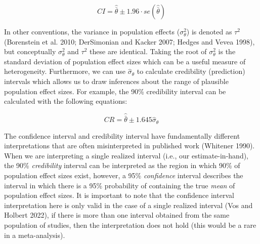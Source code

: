 \documentclass[
  letterpaper,
  DIV=11,
  numbers=noendperiod]{scrreprt}
\begin{document}
\[
CI = \hat{\bar{\theta}} \pm 1.96\cdot se(\hat{\bar{\theta}})
\]

In other conventions, the variance in population effects
(\(\sigma^2_\theta\)) is denoted as \(\tau^2\) (Borenstein et al. 2010;
DerSimonian and Kacker 2007; Hedges and Vevea 1998), but conceptually
\(\sigma^2_\theta\) and \(\tau^2\) these are identical. Taking the root
of \(\sigma^2_\theta\) is the standard deviation of population effect
sizes which can be a useful measure of heterogeneity. Furthermore, we
can use \(\hat{\sigma}_\theta\) to calculate credibility (prediction)
intervals which allows us to draw inferences about the range of
plausible population effect sizes. For example, the 90\% credibility
interval can be calculated with the following equations:

\[
CR = \hat{\bar{\theta}} \pm 1.645\hat{\sigma}_\theta
\]

The confidence interval and credibility interval have fundamentally
different interpretations that are often misinterpreted in published
work (Whitener 1990). When we are interpreting a single realized
interval (i.e., our estimate-in-hand), the 90\% \emph{credibility}
interval can be interpreted as the region in which 90\% of population
effect sizes exist, however, a 95\% \emph{confidence} interval describes
the interval in which there is a 95\% probability of containing the true
\emph{mean} of population effect sizes. It is important to note that the
confidence interval interpretation here is only valid in the case of a
single realized interval (Vos and Holbert 2022), if there is more than
one interval obtained from the same population of studies, then the
interpretation does not hold (this would be a rare in a meta-analysis).
\end{document}
